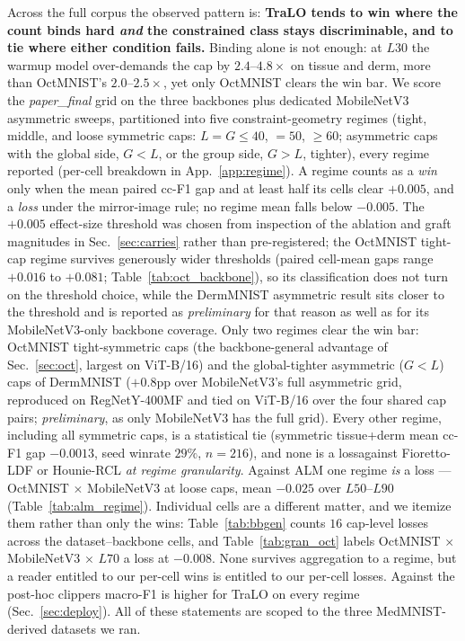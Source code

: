 \documentclass[10pt]{article}
\begin{document}
Across the full corpus the observed pattern is: \textbf{TraLO tends to win
where the count binds hard \emph{and} the constrained class stays
discriminable, and to tie where either condition fails.} Binding alone is not enough: at
$L30$ the warmup model over-demands the cap by $2.4$--$4.8\times$ on tissue
and derm, more than OctMNIST's $2.0$--$2.5\times$, yet only OctMNIST clears
the win bar. We score the \emph{paper\_final} grid on the three backbones
plus dedicated MobileNetV3 asymmetric sweeps, partitioned into five
constraint-geometry regimes (tight, middle, and loose symmetric caps:
$L{=}G{\le}40$, ${=}50$, ${\ge}60$; asymmetric caps with the global side,
$G{<}L$, or the group side, $G{>}L$, tighter), every regime reported
(per-cell breakdown in App.~\ref{app:regime}). A regime counts as a
\emph{win} only when the mean paired cc-F1 gap and at least half its
cells clear $+0.005$, and a \emph{loss} under the mirror-image rule; no
regime mean falls below $-0.005$. The $+0.005$ effect-size threshold
was chosen from inspection of the ablation and graft magnitudes in
Sec.~\ref{sec:carries} rather than pre-registered; the OctMNIST
tight-cap regime survives generously wider thresholds (paired cell-mean
gaps range $+0.016$ to $+0.081$; Table~\ref{tab:oct_backbone}), so its
classification does not turn on the threshold choice, while the
DermMNIST asymmetric result sits closer to the threshold and is
reported as \emph{preliminary} for that reason as well as for its
MobileNetV3-only backbone coverage. Only two regimes clear the win bar:
OctMNIST tight-symmetric caps (the backbone-general advantage of
Sec.~\ref{sec:oct}, largest on ViT-B/16) and the global-tighter
asymmetric ($G{<}L$) caps of DermMNIST ($+0.8$pp over MobileNetV3's full
asymmetric grid, reproduced on RegNet{Y-400MF} and tied on ViT{-B/16} over the four shared
cap pairs; \emph{preliminary}, as only MobileNetV3 has the full grid).
Every other regime, including all symmetric caps, is a statistical tie
(symmetric tissue+derm mean cc-F1 gap $-0.0013$, seed winrate $29\%$,
$n{=}216$), and none is a loss{against Fioretto-LDF or Hounie-RCL
\emph{at regime granularity}. Against ALM one regime \emph{is} a loss --- OctMNIST
$\times$ MobileNetV3 at loose caps, mean $-0.025$ over $L50$--$L90$
(Table~\ref{tab:alm_regime}).
Individual cells are a different matter, and we itemize them rather than only
the wins: Table~\ref{tab:bbgen} counts $16$ cap-level losses across the
dataset--backbone cells, and Table~\ref{tab:gran_oct} labels
OctMNIST$\,\times\,$MobileNetV3$\,\times\,L70$ a loss at $-0.008$. None survives
aggregation to a regime, but a reader entitled to our per-cell wins is entitled
to our per-cell losses}. Against the post-hoc clippers macro-F1 is
higher for TraLO on every regime (Sec.~\ref{sec:deploy}). All of these
statements are scoped to the three MedMNIST-derived datasets we ran.
\end{document}
